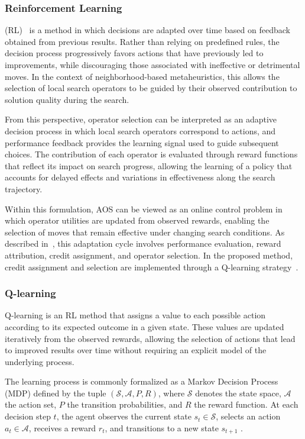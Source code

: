 \documentclass[runningheads]{llncs}
\begin{document}
\subsubsection{Reinforcement Learning}

(RL)~\cite{sutton1998reinforcement} is a method in which decisions are adapted over time based on feedback obtained from previous results. 
Rather than relying on predefined rules, the decision process progressively favors actions that have previously led to improvements, while discouraging those associated with ineffective or detrimental moves. 
In the context of neighborhood-based metaheuristics, this allows the selection of local search operators to be guided by their observed contribution to solution quality during the search.

From this perspective, operator selection can be interpreted as an adaptive decision process in which local search operators correspond to actions, and performance feedback provides the learning signal used to guide subsequent choices. 
The contribution of each operator is evaluated through reward functions that reflect its impact on search progress, allowing the learning of a policy that accounts for delayed effects and variations in effectiveness along the search trajectory.

Within this formulation, AOS can be viewed as an online control problem in which operator utilities are updated from observed rewards, enabling the selection of moves that remain effective under changing search conditions. 
As described in~\cite{fialho2010analyzing}, this adaptation cycle involves performance evaluation, reward attribution, credit assignment, and operator selection. In the proposed method, credit assignment and selection are implemented through a Q-learning strategy~\cite{Wauters2013}.


\subsubsection{Q-learning}

Q-learning is an RL method that assigns a value to each possible action according to its expected outcome in a given state. 
These values are updated iteratively from the observed rewards, allowing the selection of actions that lead to improved results over time without requiring an explicit model of the underlying process.

The learning process is commonly formalized as a Markov Decision Process (MDP) defined by the tuple $(\mathcal{S}, \mathcal{A}, P, R)$, where $\mathcal{S}$ denotes the state space, $\mathcal{A}$ the action set, $P$ the transition probabilities, and $R$ the reward function. At each decision step $t$, the agent observes the current state $s_t \in \mathcal{S}$, selects an action $a_t \in \mathcal{A}$, receives a reward $r_t$, and transitions to a new state $s_{t+1}$ \cite{watkins1989learning}.
\end{document}
